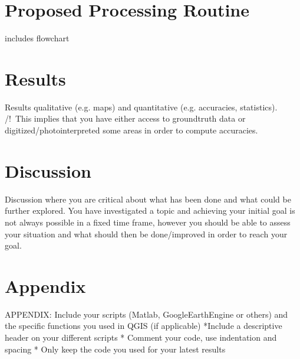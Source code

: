 \documentclass[11pt]{article}
\begin{document}
	\section{Proposed Processing Routine}
	includes flowchart
	
	\section{Results}
	Results qualitative (e.g. maps) and quantitative (e.g. accuracies, statistics). /!\ This implies that you have either access to groundtruth data or digitized/photointerpreted some areas in order to compute accuracies.
	
	\section{Discussion}
	Discussion where you are critical about what has been done and what could be further explored. You have investigated a topic and achieving your initial goal is not always possible in a fixed time frame, however you should be able to assess your situation and what should then be done/improved in order to reach your goal.
	
	\section{Appendix}
	APPENDIX: Include your scripts (Matlab, GoogleEarthEngine or others) and the specific functions you used in QGIS (if applicable)
	*Include a descriptive header on your different scripts
	* Comment your code, use indentation and spacing
	* Only keep the code you used for your latest results
	
	
	
	 
	
	
\end{document}
